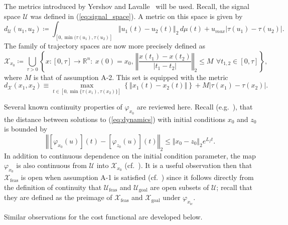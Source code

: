 \documentclass{llncs}
\begin{document}
The metrics introduced by Yershov and Lavalle~\cite{yershov2011sufficient} will be used.  
%
Recall, the signal space $\mathcal{U}$ was defined in (\ref{eq:signal_space}).
A metric on this space is given by 
\begin{equation}
d_{\mathcal{U}}(u_{1},u_{2})\coloneqq\int_{[0,\min(\tau(u_{1}),\tau(u_{2})]}\Vert u_{1}(t)-u_{2}(t)\Vert_{2} \, d\mu(t)+u_{max}|\tau(u_{1})-\tau(u_{2})|.\label{eq:du}
\end{equation}
The family of trajectory spaces are now more precisely defined as 
\begin{equation}
\mathcal{X}_{x_0} \coloneqq \bigcup_{\tau>0}\left\{ x:[0,\tau]\rightarrow \mathbb{R}^n: \: x(0)=x_{0}, \, \left\Vert \frac{x(t_{1})-x(t_{2})}{|t_{1}-t_{2}|}\right\Vert _{2}\leq M\:\, \forall t_{1,2}\in[0,\tau]\right\} ,\label{eq:traj_space}
\end{equation}
where $M$ is that of assumption A-2. This set is equipped with the metric 
\begin{equation}
d_{\mathcal{X}}(x_{1},x_{2})\equiv\max_{t\in\left[0,\min\{\tau(x_{1}),\tau(x_{2})\}\right]}\left\{ \left\Vert x_{1}(t)-x_{2}(t)\right\Vert \right\} +M|\tau(x_{1})-\tau(x_{2})|.\label{eq:traj_metric}
\end{equation}

Several known continuity properties of $\varphi_{x_0}$ are reviewed here. Recall (e.g.~\cite[pg. 95]{khalil1996nonlinear}), that the distance between solutions to (\ref{eq:dynamics}) with initial conditions $x_0$ and $z_0$ is bounded by
\begin{equation}\label{lem:cont_ic}
\left\Vert [\varphi_{x_{0}}(u)](t)-[\varphi_{z_{0}}(u)](t)\right\Vert _{2}\leq\Vert x_{0}-z_{0}\Vert_{2}e^{L_{f}t}.
\end{equation}  
%
In addition to continuous dependence on the initial condition parameter, the map $\varphi_{x_{0}}$ is also continuous from $\mathcal{U}$ into $\mathcal{X}_{x_{0}}$ (cf.~\cite[Theorem 1]{yershov2011sufficient}). It is a  useful observation then that $\mathcal{X}_\mathrm{feas}$ is open when assumption A-1 is satisfied (cf.~\cite[Theorem 2]{yershov2011sufficient}) since it follows directly from the definition of continuity that $\mathcal{U}_\mathrm{feas}$ and $\mathcal{U}_\mathrm{goal}$ are open subsets of $\mathcal{U}$; recall that they are defined as the preimage of $\mathcal{X}_\mathrm{feas}$ and $\mathcal{X}_\mathrm{goal}$ under $\varphi_{x_\mathrm{ic}}$.

Similar observations for the cost functional are developed below.
\end{document}
